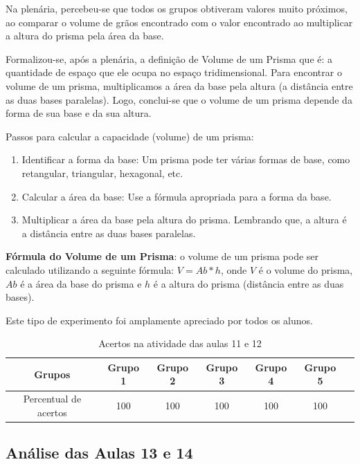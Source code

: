 Na plenária, percebeu-se que todos os grupos obtiveram valores muito próximos, ao comparar o volume de grãos encontrado com o valor encontrado ao multiplicar a altura do prisma pela área da base.

Formalizou-se, após a plenária, a definição de Volume de um Prisma que é: a quantidade de espaço que ele ocupa no espaço tridimensional. Para encontrar o volume de um prisma, multiplicamos a área da base pela altura (a distância entre as duas bases paralelas). Logo, conclui-se que o volume de um prisma depende da forma de sua base e da sua altura.

Passos para calcular a capacidade (volume) de um prisma:

\begin{enumerate}
    \item Identificar a forma da base: Um prisma pode ter várias formas de base, como retangular, triangular, hexagonal, etc.
    \item Calcular a área da base: Use a fórmula apropriada para a forma da base.
    \item Multiplicar a área da base pela altura do prisma. Lembrando que, a altura é a distância entre as duas bases paralelas.
\end{enumerate}

\textbf{Fórmula do Volume de um Prisma}: o volume de um prisma pode ser calculado utilizando a seguinte fórmula: $V = Ab * h$, onde $V$ é o volume do prisma, $Ab$ é a área da base do prisma e $h$ é a altura do prisma (distância entre as duas bases).

Este tipo de experimento foi amplamente apreciado por todos os alunos.

\begin{table}[htbp] \centering
    \caption{Acertos na atividade das aulas 11 e 12} \label{tab:Acertos do Encontro 6}
    \begin{tabular}{|c|c|c|c|c|c|c|}
        \hline
        \textbf{Grupos}       & \textbf{Grupo 1} & \textbf{Grupo 2} & \textbf{Grupo 3} & \textbf{Grupo 4} & \textbf{Grupo 5} \\
        \hline
        Percentual de acertos & 100              & 100              & 100              & 100              & 100              \\
        \hline
    \end{tabular}
    \legend{\legendaTabela}
\end{table}

\subsection{Análise das Aulas 13 e 14}

